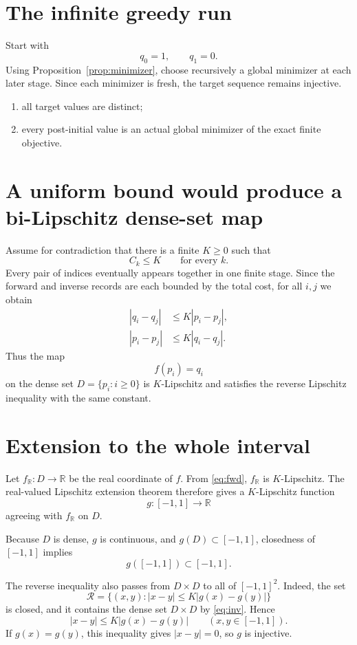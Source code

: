 \documentclass[11pt]{amsart}
\theoremstyle{definition}
\theoremstyle{remark}
\newcommand{\R}{\mathbb R}
\begin{document}
\section{The infinite greedy run}

Start with
\[
q_0=1,\qquad q_1=0.
\]
Using Proposition~\ref{prop:minimizer}, choose recursively a global minimizer at each later stage.  Since each minimizer is fresh, the target sequence remains injective.

\begin{enumerate}[label=\textup{(\alph*)}]
\item all target values are distinct;
\item every post-initial value is an actual global minimizer of the exact finite objective.
\end{enumerate}


\section{A uniform bound would produce a bi-Lipschitz dense-set map}

Assume for contradiction that there is a finite $K\ge0$ such that
\[
C_k\le K\qquad\text{for every }k.
\]
Every pair of indices eventually appears together in one finite stage.  Since the forward and inverse records are each bounded by the total cost, for all $i,j$ we obtain
\begin{align}
 |q_i-q_j|&\le K|p_i-p_j|,\label{eq:fwd}\\
 |p_i-p_j|&\le K|q_i-q_j|.\label{eq:inv}
\end{align}
Thus the map
\[
f(p_i)=q_i
\]
on the dense set $D=\{p_i:i\ge0\}$ is $K$-Lipschitz and satisfies the reverse Lipschitz inequality with the same constant.


\section{Extension to the whole interval}

Let $f_\R:D\to\R$ be the real coordinate of $f$.  From \eqref{eq:fwd}, $f_\R$ is $K$-Lipschitz.  The real-valued Lipschitz extension theorem therefore gives a $K$-Lipschitz function
\[
g:[-1,1]\longrightarrow\R
\]
agreeing with $f_\R$ on $D$.

Because $D$ is dense, $g$ is continuous, and $g(D)\subset[-1,1]$, closedness of $[-1,1]$ implies
\[
g([-1,1])\subset[-1,1].
\]

The reverse inequality also passes from $D\times D$ to all of $[-1,1]^2$.  Indeed, the set
\[
\mathcal R=\{(x,y): |x-y|\le K|g(x)-g(y)|\}
\]
is closed, and it contains the dense set $D\times D$ by \eqref{eq:inv}.  Hence
\[
|x-y|\le K|g(x)-g(y)|\qquad(x,y\in[-1,1]).
\]
If $g(x)=g(y)$, this inequality gives $|x-y|=0$, so $g$ is injective.
\end{document}
